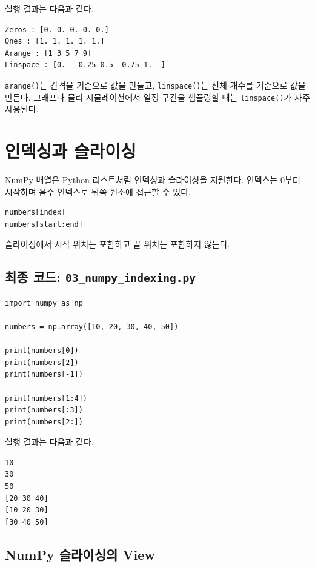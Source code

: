 \documentclass[11pt,a4paper]{article}
\begin{document}
실행 결과는 다음과 같다.

\begin{verbatim}
Zeros : [0. 0. 0. 0. 0.]
Ones : [1. 1. 1. 1. 1.]
Arange : [1 3 5 7 9]
Linspace : [0.   0.25 0.5  0.75 1.  ]
\end{verbatim}

\begin{importantbox}
\texttt{arange()}는 간격을 기준으로 값을 만들고, \texttt{linspace()}는 전체 개수를 기준으로 값을 만든다. 그래프나 물리 시뮬레이션에서 일정 구간을 샘플링할 때는 \texttt{linspace()}가 자주 사용된다.
\end{importantbox}

\section{인덱싱과 슬라이싱}

NumPy 배열은 Python 리스트처럼 인덱싱과 슬라이싱을 지원한다. 인덱스는 0부터 시작하며 음수 인덱스로 뒤쪽 원소에 접근할 수 있다.

\begin{lstlisting}
numbers[index]
numbers[start:end]
\end{lstlisting}

슬라이싱에서 시작 위치는 포함하고 끝 위치는 포함하지 않는다.

\subsection{최종 코드: \texttt{03\_numpy\_indexing.py}}

\begin{lstlisting}
import numpy as np

numbers = np.array([10, 20, 30, 40, 50])

print(numbers[0])
print(numbers[2])
print(numbers[-1])

print(numbers[1:4])
print(numbers[:3])
print(numbers[2:])
\end{lstlisting}

실행 결과는 다음과 같다.

\begin{verbatim}
10
30
50
[20 30 40]
[10 20 30]
[30 40 50]
\end{verbatim}

\subsection{NumPy 슬라이싱의 View}
\end{document}
